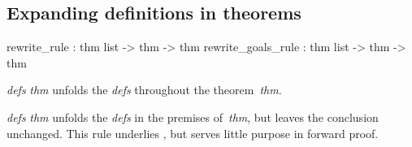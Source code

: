 \subsection{Expanding definitions in theorems}
\begin{ttbox} 
rewrite_rule       : thm list -> thm -> thm
rewrite_goals_rule : thm list -> thm -> thm
\end{ttbox}
\begin{ttdescription}
\item[\ttindexbold{rewrite_rule} {\it defs} {\it thm}]  
unfolds the {\it defs} throughout the theorem~{\it thm}.

\item[\ttindexbold{rewrite_goals_rule} {\it defs} {\it thm}]  
unfolds the {\it defs} in the premises of~{\it thm}, but leaves the
conclusion unchanged.  This rule underlies , but 
serves little purpose in forward proof.
\end{ttdescription}


